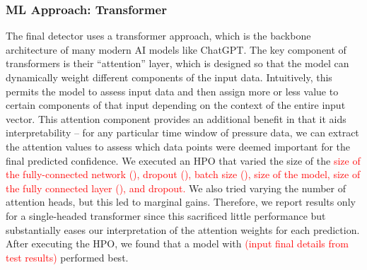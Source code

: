 \subsubsection{ML Approach: Transformer}
The final detector uses a transformer approach, which is the backbone architecture of many modern AI models like ChatGPT.
The key component of transformers is their ``attention'' layer, which is designed so that the model can dynamically weight different components of the input data. 
Intuitively, this permits the model to assess input data and then assign more or less value to certain components of that input depending on the context of the entire input vector.
This attention component provides an additional benefit in that it aids interpretability -- for any particular time window of pressure data, we can extract the attention values to assess which data points were deemed important for the final predicted confidence.
We executed an \acrshort{HPO} that varied the size of the \textcolor{red}{size of the fully-connected network (), dropout (), batch size (), size of the model, size of the fully connected layer (), and dropout.} 
We also tried varying the number of attention heads, but this led to marginal gains. 
Therefore, we report results only for a single-headed transformer since this sacrificed little performance but substantially eases our interpretation of the attention weights for each prediction.
After executing the \acrshort{HPO}, we found that a model with \textcolor{red}{(input final details from test results)} performed best.

